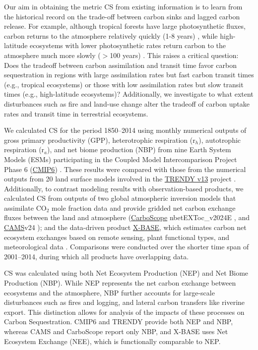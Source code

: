 \documentclass[9pt,twocolumn,twoside]{pnas-new}
\begin{document}
Our aim in obtaining the metric CS from existing information is to learn from the historical record on the trade-off between carbon sinks and lagged carbon release. For example, although tropical forests have large photosynthetic fluxes, carbon returns to the atmosphere relatively quickly (1-8 years) \cite{Sierra2021JE,Chanca2025}, while high-latitude ecosystems with lower photosynthetic rates return carbon to the atmosphere much more slowly ($>$100 years) \cite{Carvalhais2014, Lu2018}. This raises a critical question: Does the tradeoff between carbon assimilation and transit time favor carbon sequestration in regions with large assimilation rates but fast carbon transit times (e.g., tropical ecosystems) or those with low assimilation rates but slow transit times (e.g., high-latitude ecosystems)? Additionally, we investigate to what extent disturbances such as fire and land-use change alter the tradeoff of carbon uptake rates and transit time in terrestrial ecosystems.

We calculated CS for the period 1850–2014 using monthly numerical outputs of gross primary productivity (GPP), heterotrophic respiration (r$_h$), autotrophic respiration (r$_a$), and net biome production (NBP) from nine Earth System Models (ESMs) participating in the Coupled Model Intercomparison Project Phase 6 (\hyperlink{https://pcmdi.llnl.gov/CMIP6/}{CMIP6}) \cite{Eyring2016}. These results were compared with those from the numerical outputs from 20 land surface models involved in the \hyperlink{https://globalcarbonbudgetdata.org/}{TRENDY v13} project \cite{Sitch2024}. Additionally, to contrast modeling results with observation-based products, we calculated CS from outputs of two global atmospheric inversion models that assimilate CO$_2$ mole fraction data and provide gridded net carbon exchange fluxes between the land and atmosphere (\hyperlink{https://www.bgc-jena.mpg.de/CarboScope/}{CarboScope} nbetEXToc\_v2024E \cite{Rodenbeck2005}, and \hyperlink{https://ads.atmosphere.copernicus.eu/datasets/cams-global-greenhouse-gas-inversion?tab=overview}{CAMS}v24 \cite{Chevallier2013}); and the data-driven product \hyperlink{https://www.icos-cp.eu/data-products/fluxcom-x-global-fluxes-collection}{X-BASE}, which estimates carbon net ecosystem exchanges based on remote sensing, plant functional types, and meteorological data \cite{Nelson2024}. Comparisons were conducted over the shorter time span of 2001–2014, during which all products have overlapping data.

CS was calculated using both Net Ecosystem Production (NEP) and Net Biome Production (NBP). While NEP represents the net carbon exchange between ecosystems and the atmosphere, NBP further accounts for large-scale disturbances such as fires and logging, and lateral carbon transfers like riverine export. This distinction allows for analysis of the impacts of these processes on Carbon Sequestration. CMIP6 and TRENDY provide both NEP and NBP, whereas CAMS and CarboScope report only NBP, and X-BASE uses Net Ecosystem Exchange (NEE), which is functionally comparable to NEP.
\end{document}
